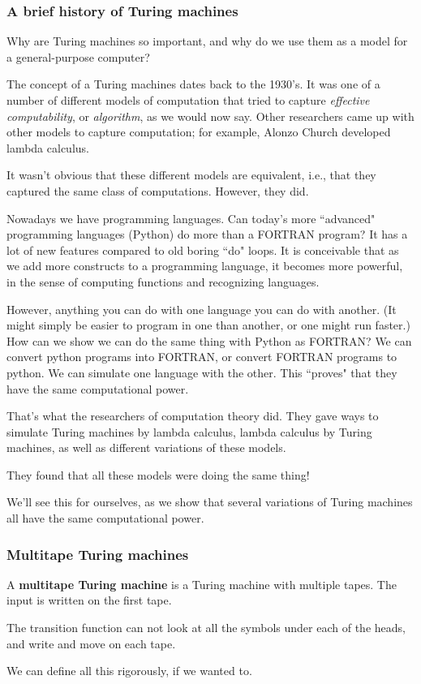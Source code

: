 \subsubsection{A brief history of Turing machines}
Why are Turing machines so important, and why do we use them as a model for a general-purpose computer?

The concept of a Turing machines dates back to the 1930's. It was one of a number of different models of computation that tried to capture {\it effective computability}, or {\it algorithm},  as we would now say. Other researchers came up with other models to capture computation; for example, Alonzo Church developed lambda calculus. 

It wasn't obvious that these different models are equivalent, i.e., that they captured the same class of computations. However, they did.


Nowadays we have programming languages. %
Can today's more ``advanced" programming languages 
(Python) do more than a FORTRAN program? It has a lot of new features compared to old boring ``do" loops. It is conceivable that as we add more constructs to a programming language, it becomes more powerful, in the sense of computing functions and recognizing languages.

However, anything you can do with one language you can do with another. (It might simply be easier to program in one than another, or one might run faster.) How can we show we can do the same thing with Python as FORTRAN? %
We can convert python programs into FORTRAN, or convert FORTRAN programs to python. We can simulate one language with the other. This ``proves" that they have the same computational power.

That's what the researchers of computation theory did. They gave ways to simulate Turing machines by lambda calculus, lambda calculus by Turing machines, as well as different variations of these models.

They found that all these models were doing the same thing!

We'll see this for ourselves, as we show that several variations of Turing machines all have the same computational power.
\subsubsection{Multitape Turing machines}
\begin{df}
A \textbf{multitape Turing machine} is a Turing machine with multiple tapes. The input is written on the first tape.

The transition function can not look at all the symbols under each of the heads, and write and move on each tape.
\end{df}
We can define all this rigorously, if we wanted to.

